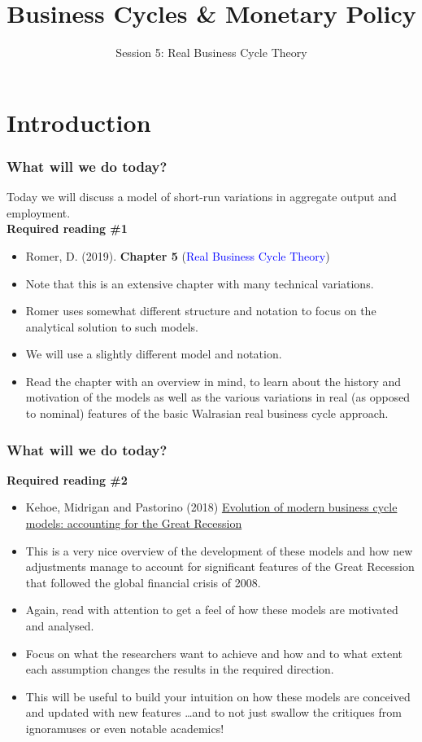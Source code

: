 \documentclass[10pt, handout]{beamer} %
\title[5. RBC model]{Business Cycles \& Monetary Policy}
\subtitle{\large Session 5: Real Business Cycle Theory}
\institute[UCT]{ECO5021F: Advanced Macroeconomics\\ University of Cape Town}
\author{}
\date{} %
\begin{document}
\frame{\titlepage}


\frame{\tableofcontents}


\section{Introduction}

\begin{frame}
\frametitle{What will we do today?}
Today we will discuss a model of short-run variations in aggregate output and employment. \\ \vskip0.5cm
\noindent \textbf{Required reading \#1}
\begin{itemize}
\item Romer, D. (2019). \textbf{Chapter 5} (\textcolor{blue}{Real Business Cycle Theory})
\item Note that this is an extensive chapter with many technical variations. 
\item Romer uses somewhat different structure and notation to focus on the analytical solution to such models.
\item We will use a slightly different model and notation. 
\item Read the chapter with an overview in mind, to learn about the history and motivation of the models as well as the various variations in real (as opposed to nominal) features of the basic Walrasian real business cycle approach.
\end{itemize}
 
\end{frame}


\begin{frame}
\frametitle{What will we do today?}

\noindent \textbf{Required reading \#2}
\begin{itemize}
\item Kehoe, Midrigan and Pastorino (2018) \href{https://ideas.repec.org/p/fip/fedmsr/566.html}{Evolution of modern business cycle models: accounting for the Great Recession}
\item This is a very nice overview of the development of these models and how new adjustments manage to account for significant features of the Great Recession that followed the global financial crisis of 2008.
\item Again, read with attention to get a feel of how these models are motivated and analysed. 
\item Focus on what the researchers want to achieve and how and to what extent each assumption changes the results in the required direction. 
\item This will be useful to build your intuition on how these models are conceived and updated with new features \ldots and to not just swallow the critiques from ignoramuses or even notable academics! 
\end{itemize} 
 
\end{frame}
\end{document}
